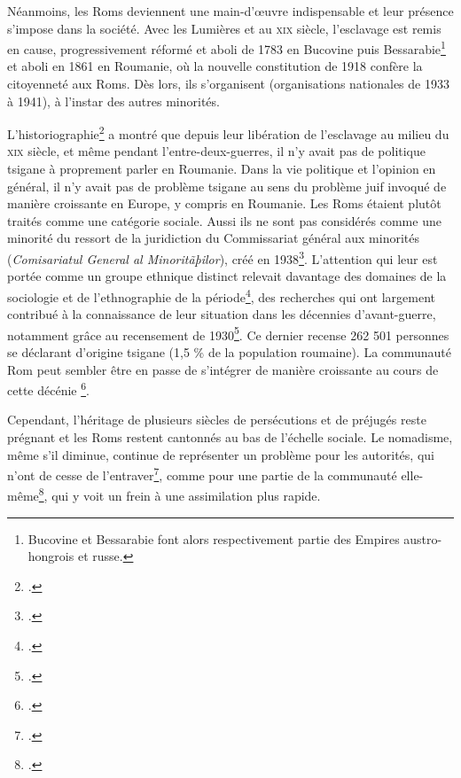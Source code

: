 \documentclass[a4paper,12pt,twoside]{book}
\newcommand{\siecle}[1]{\textsc{#1}\ieme}
\begin{document}
		    Néanmoins, les Roms deviennent une main-d'œuvre indispensable et leur présence s'impose dans la société. Avec les Lumières et au \siecle{xix} siècle, l'esclavage est remis en cause, progressivement réformé et aboli de 1783 en Bucovine puis Bessarabie\footnote{Bucovine et Bessarabie font alors respectivement partie des Empires austro-hongrois et russe.} et aboli en 1861 en Roumanie, où la nouvelle constitution de 1918 confère la citoyenneté aux Roms. Dès lors, ils s'organisent (organisations nationales de 1933 à 1941), à l'instar des autres minorités. 

    		L'historiographie\footcites(Voir~: )()[][pp.~87-161]{achimRomaRomanianHistory2004}{anastasoaieRomaGypsiesHistory2003}{mateiNationalismPragmatismRoma2020} a montré que depuis leur libération de l'esclavage au milieu du \siecle{xix} siècle, et même pendant l'entre-deux-guerres, il n'y avait pas de politique tsigane à proprement parler en Roumanie. Dans la vie politique et l'opinion en général, il n'y avait pas de \og{}problème tsigane\fg{} au sens du \og{}problème juif\fg{} invoqué de manière croissante en Europe, y compris en Roumanie. Les Roms étaient plutôt traités comme une catégorie sociale. Aussi ils ne sont pas considérés comme une minorité du ressort de la juridiction du Commissariat général aux minorités (\textit{Comisariatul General al Minoritãþilor}), créé en 1938\footcite[][p.~163]{achimRomaRomanianHistory2004}. L'attention qui leur est portée comme un groupe ethnique distinct relevait davantage des domaines de la sociologie et de l'ethnographie de la période\footcite[Notamment~:  George Potra, \textit{Contribuţiuni la istoricul ţiganilor din România}, Ed. Fundatia Regele Carol I, 1939); Ion Chelcea, \textit{Ţiganii din România monografie etnografică}, Ed. Institutul Central de Statistică, 1944), citées par~:][]{anastasoaieRomaGypsiesHistory2003}, des recherches qui ont largement contribué à la connaissance de leur situation dans les décennies d'avant-guerre, notamment grâce au recensement de 1930\footcite[][pp.~163–167]{achimRomaRomanianHistory2004}. Ce dernier recense 262 501 personnes se déclarant d'origine tsigane (1,5 \%
            de la population roumaine). La communauté Rom peut sembler être en passe de s'intégrer de manière croissante au cours de cette décénie \footcite[][pp.~223–224]{internationalcommisionontheholocaustinromaniaFinalReport2005a}.
            
            Cependant, l'héritage de plusieurs siècles de persécutions et de préjugés reste prégnant et les Roms restent cantonnés au bas de l'échelle sociale. Le nomadisme, même s'il diminue, continue de représenter un problème pour les autorités, qui n'ont de cesse de l'entraver\footcite[Voir la collection de transcriptions d'archives des autorités~:][]{nastasaVolumeDocumentsGypsies2001}, comme pour une partie de la communauté elle-même\footcite{marushiakovaLetterStalinRoma2020}, qui y voit un frein à une assimilation plus rapide.
            
\end{document}
